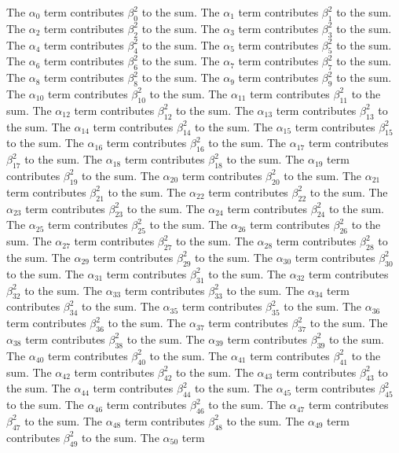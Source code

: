 \begin{lemma}\label{hx-0012}
The $\alpha_{0}$ term contributes $\beta_{0}^{2}$ to the sum. The $\alpha_{1}$ term contributes $\beta_{1}^{2}$ to the sum. The $\alpha_{2}$ term contributes $\beta_{2}^{2}$ to the sum. The $\alpha_{3}$ term contributes $\beta_{3}^{2}$ to the sum. The $\alpha_{4}$ term contributes $\beta_{4}^{2}$ to the sum. The $\alpha_{5}$ term contributes $\beta_{5}^{2}$ to the sum. The $\alpha_{6}$ term contributes $\beta_{6}^{2}$ to the sum. The $\alpha_{7}$ term contributes $\beta_{7}^{2}$ to the sum. The $\alpha_{8}$ term contributes $\beta_{8}^{2}$ to the sum. The $\alpha_{9}$ term contributes $\beta_{9}^{2}$ to the sum. The $\alpha_{10}$ term contributes $\beta_{10}^{2}$ to the sum. The $\alpha_{11}$ term contributes $\beta_{11}^{2}$ to the sum. The $\alpha_{12}$ term contributes $\beta_{12}^{2}$ to the sum. The $\alpha_{13}$ term contributes $\beta_{13}^{2}$ to the sum. The $\alpha_{14}$ term contributes $\beta_{14}^{2}$ to the sum. The $\alpha_{15}$ term contributes $\beta_{15}^{2}$ to the sum. The $\alpha_{16}$ term contributes $\beta_{16}^{2}$ to the sum. The $\alpha_{17}$ term contributes $\beta_{17}^{2}$ to the sum. The $\alpha_{18}$ term contributes $\beta_{18}^{2}$ to the sum. The $\alpha_{19}$ term contributes $\beta_{19}^{2}$ to the sum. The $\alpha_{20}$ term contributes $\beta_{20}^{2}$ to the sum. The $\alpha_{21}$ term contributes $\beta_{21}^{2}$ to the sum. The $\alpha_{22}$ term contributes $\beta_{22}^{2}$ to the sum. The $\alpha_{23}$ term contributes $\beta_{23}^{2}$ to the sum. The $\alpha_{24}$ term contributes $\beta_{24}^{2}$ to the sum. The $\alpha_{25}$ term contributes $\beta_{25}^{2}$ to the sum. The $\alpha_{26}$ term contributes $\beta_{26}^{2}$ to the sum. The $\alpha_{27}$ term contributes $\beta_{27}^{2}$ to the sum. The $\alpha_{28}$ term contributes $\beta_{28}^{2}$ to the sum. The $\alpha_{29}$ term contributes $\beta_{29}^{2}$ to the sum. The $\alpha_{30}$ term contributes $\beta_{30}^{2}$ to the sum. The $\alpha_{31}$ term contributes $\beta_{31}^{2}$ to the sum. The $\alpha_{32}$ term contributes $\beta_{32}^{2}$ to the sum. The $\alpha_{33}$ term contributes $\beta_{33}^{2}$ to the sum. The $\alpha_{34}$ term contributes $\beta_{34}^{2}$ to the sum. The $\alpha_{35}$ term contributes $\beta_{35}^{2}$ to the sum. The $\alpha_{36}$ term contributes $\beta_{36}^{2}$ to the sum. The $\alpha_{37}$ term contributes $\beta_{37}^{2}$ to the sum. The $\alpha_{38}$ term contributes $\beta_{38}^{2}$ to the sum. The $\alpha_{39}$ term contributes $\beta_{39}^{2}$ to the sum. The $\alpha_{40}$ term contributes $\beta_{40}^{2}$ to the sum. The $\alpha_{41}$ term contributes $\beta_{41}^{2}$ to the sum. The $\alpha_{42}$ term contributes $\beta_{42}^{2}$ to the sum. The $\alpha_{43}$ term contributes $\beta_{43}^{2}$ to the sum. The $\alpha_{44}$ term contributes $\beta_{44}^{2}$ to the sum. The $\alpha_{45}$ term contributes $\beta_{45}^{2}$ to the sum. The $\alpha_{46}$ term contributes $\beta_{46}^{2}$ to the sum. The $\alpha_{47}$ term contributes $\beta_{47}^{2}$ to the sum. The $\alpha_{48}$ term contributes $\beta_{48}^{2}$ to the sum. The $\alpha_{49}$ term contributes $\beta_{49}^{2}$ to the sum. The $\alpha_{50}$ term 
\end{lemma}
